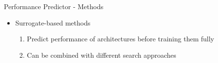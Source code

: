 \documentclass[main]{subfiles}
\begin{document}
\begin{frame}{Performance Predictor - Methods}

\begin{itemize}
\item Surrogate-based methods~
\begin{enumerate}
\item Predict performance of architectures before training them fully
\item Can be combined with different search approaches
\end{enumerate}
\end{itemize}

\end{frame}
\end{document}
